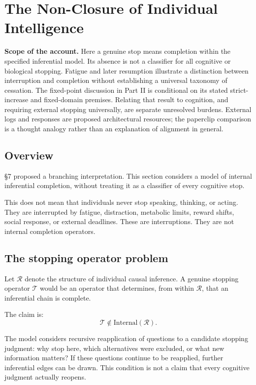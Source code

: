 \section{The Non-Closure of Individual Intelligence}

\noindent\textbf{Scope of the account.} Here a genuine stop means completion within the specified inferential model. Its absence is not a classifier for all cognitive or biological stopping. Fatigue and later resumption illustrate a distinction between interruption and completion without establishing a universal taxonomy of cessation. The fixed-point discussion in Part II is conditional on its stated strict-increase and fixed-domain premises. Relating that result to cognition, and requiring external stopping universally, are separate unresolved burdens. External logs and responses are proposed architectural resources; the paperclip comparison is a thought analogy rather than an explanation of alignment in general.


\subsection{Overview}

\S{}7 proposed a branching interpretation. This section considers a model of internal inferential completion, without treating it as a classifier of every cognitive stop.

This does not mean that individuals never stop speaking, thinking, or acting. They are interrupted by fatigue, distraction, metabolic limits, reward shifts, social response, or external deadlines. These are interruptions. They are not internal completion operators.

\subsection{The stopping operator problem}

Let \(\mathcal{R}\) denote the structure of individual causal inference. A genuine stopping operator \(\mathcal{T}\) would be an operator that determines, from within \(\mathcal{R}\), that an inferential chain is complete.

The claim is:
\[
\mathcal{T}\notin \mathrm{Internal}(\mathcal{R}).
\]

The model considers recursive reapplication of questions to a candidate stopping judgment: why stop here, which alternatives were excluded, or what new information matters? If these questions continue to be reapplied, further inferential edges can be drawn. This condition is not a claim that every cognitive judgment actually reopens.

